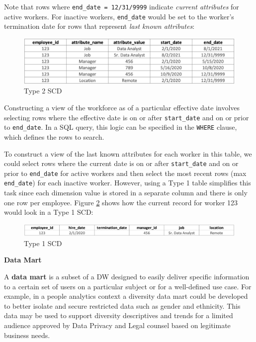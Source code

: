 \documentclass[
]{book}
\begin{document}
Note that rows where \texttt{end\_date\ =\ \textquotesingle{}12/31/9999\textquotesingle{}} indicate \emph{current attributes} for active workers. For inactive workers, \texttt{end\_date} would be set to the worker's termination date for rows that represent \emph{last known attributes}:

\begin{figure}

{\centering \includegraphics[width=1\linewidth]{graphics/type_2_table} 

}

\caption{Type 2 SCD}\label{fig:type-2-tbl}
\end{figure}

Constructing a view of the workforce as of a particular effective date involves selecting rows where the effective date is on or after \texttt{start\_date} and on or prior to \texttt{end\_date}. In a SQL query, this logic can be specified in the \texttt{WHERE} clause, which defines the rows to search.

To construct a view of the last known attributes for each worker in this table, we could select rows where the current date is on or after \texttt{start\_date} and on or prior to \texttt{end\_date} for active workers and then select the most recent rows (max \texttt{end\_date}) for each inactive worker. However, using a Type 1 table simplifies this task since each dimension value is stored in a separate column and there is only one row per employee. Figure \ref{fig:type-1-tbl} shows how the current record for worker 123 would look in a Type 1 SCD:

\begin{figure}

{\centering \includegraphics[width=1\linewidth]{graphics/type_1_table} 

}

\caption{Type 1 SCD}\label{fig:type-1-tbl}
\end{figure}

\textbf{Data Mart}

A \textbf{data mart} is a subset of a DW designed to easily deliver specific information to a certain set of users on a particular subject or for a well-defined use case. For example, in a people analytics context a diversity data mart could be developed to better isolate and secure restricted data such as gender and ethnicity. This data may be used to support diversity descriptives and trends for a limited audience approved by Data Privacy and Legal counsel based on legitimate business needs.
\end{document}
